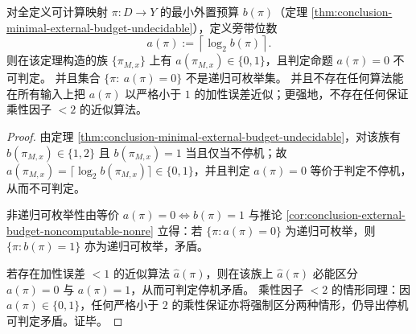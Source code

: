 \begin{corollary}[可逆提升所需旁带位数的停机不可判定性与不可近似性]\label{cor:pom-ancilla-halting-inapproximability}
对全定义可计算映射 \(\pi:D\to Y\) 的最小外置预算 \(b(\pi)\)（定理 \ref{thm:conclusion-minimal-external-budget-undecidable}），定义旁带位数
\[
a(\pi):=\left\lceil \log_2 b(\pi)\right\rceil.
\]
则在该定理构造的族 \(\{\pi_{M,x}\}\) 上有 \(a(\pi_{M,x})\in\{0,1\}\)，且判定命题 \(a(\pi)=0\) 不可判定。
并且集合 \(\{\pi:\ a(\pi)=0\}\) 不是递归可枚举集。
并且不存在任何算法能在所有输入上把 \(a(\pi)\) 以严格小于 \(1\) 的加性误差近似；更强地，不存在任何保证乘性因子 \(<2\) 的近似算法。
\end{corollary}

\begin{proof}
由定理 \ref{thm:conclusion-minimal-external-budget-undecidable}，对该族有 \(b(\pi_{M,x})\in\{1,2\}\) 且 \(b(\pi_{M,x})=1\) 当且仅当不停机；故 \(a(\pi_{M,x})=\lceil\log_2 b(\pi_{M,x})\rceil\in\{0,1\}\)，并且判定 \(a(\pi)=0\) 等价于判定不停机，从而不可判定。
\par
非递归可枚举性由等价 \(a(\pi)=0\iff b(\pi)=1\) 与推论 \ref{cor:conclusion-external-budget-noncomputable-nonre} 立得：若 \(\{\pi:a(\pi)=0\}\) 为递归可枚举，则 \(\{\pi:b(\pi)=1\}\) 亦为递归可枚举，矛盾。
\par
若存在加性误差 \(<1\) 的近似算法 \(\widehat a(\pi)\)，则在该族上 \(\widehat a(\pi)\) 必能区分 \(a(\pi)=0\) 与 \(a(\pi)=1\)，从而可判定停机矛盾。
乘性因子 \(<2\) 的情形同理：因 \(a(\pi)\in\{0,1\}\)，任何严格小于 \(2\) 的乘性保证亦将强制区分两种情形，仍导出停机可判定矛盾。证毕。
\end{proof}

